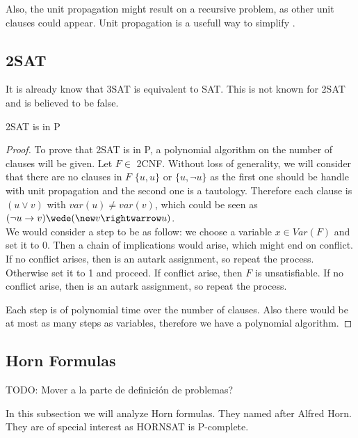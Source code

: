 Also, the unit propagation might result on a recursive problem, as other unit clauses could appear. Unit propagation is a usefull way to simplify . \\ 






\subsection{2SAT}
It is already know that 3SAT is equivalent to SAT. This is not known for 2SAT and is believed to be false.

\begin{proposition}
  2SAT is in P 
\end{proposition}
\begin{proof}

  To prove that 2SAT is in P, a polynomial algorithm on the number of clauses will be given. Let $F \in$ 2CNF.  Without loss of generality, we will consider that there are no clauses in $F$ $\{u,u\}$ or $\{u,\neg u\}$ as the first one should be handle with unit propagation and the second one is a tautology. Therefore each clause is $(u \vee v)$ with $var(u) \ne var(v)$, which could be seen as $(\neg u \rightarrow v) \wede (\new v \rightwarrow u)$.\\


  
  We would consider a step to be as follow: we choose a variable $x \in Var(F)$ and set it to 0. Then a chain of implications would arise, which might end on conflict. If no conflict arises, then is an autark assignment, so repeat the process. Otherwise set it to 1 and proceed. If conflict arise, then $F$ is unsatisfiable. If no conflict arise, then is an autark assignment, so repeat the process.
  

  Each step is of polynomial time over the number of clauses. Also there would be at most as many steps as variables, therefore we have a polynomial algorithm.
  
 
\end{proof}

\subsection{Horn Formulas}


TODO: Mover a la parte de definición de problemas?

In this subsection we will analyze Horn formulas. They named after Alfred Horn\cite{horn1951sentences}. They are of special interest as HORNSAT is P-complete.



